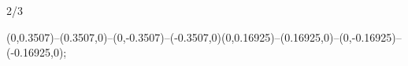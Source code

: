 \begin{flagdescription}{2/3}
\begin{scope}[shift={(0.5\flaglength,0.5)}]
\def\x{0.3507}
\def\y{0.16925}
   (0,\x)--(\x,0)--(0,-\x)--(-\x,0)(0,\y)--(\y,0)--(0,-\y)--(-\y,0);
\end{scope}
\framecode{}
\end{flagdescription}
